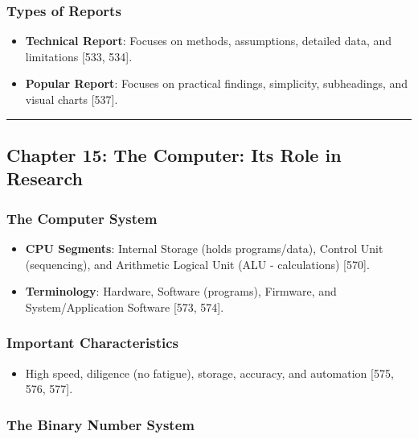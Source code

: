 \documentclass[
]{article}
\providecommand{\tightlist}{%
  \setlength{\itemsep}{0pt}\setlength{\parskip}{0pt}}
\begin{document}
\subsubsection{Types of Reports}\label{types-of-reports}

\begin{itemize}
\tightlist
\item
  \textbf{Technical Report}: Focuses on methods, assumptions, detailed
  data, and limitations {[}533, 534{]}.
\item
  \textbf{Popular Report}: Focuses on practical findings, simplicity,
  subheadings, and visual charts {[}537{]}.
\end{itemize}

\begin{center}\rule{0.5\linewidth}{0.5pt}\end{center}

\subsection{Chapter 15: The Computer: Its Role in
Research}\label{chapter-15-the-computer-its-role-in-research}

\subsubsection{The Computer System}\label{the-computer-system}

\begin{itemize}
\tightlist
\item
  \textbf{CPU Segments}: Internal Storage (holds programs/data), Control
  Unit (sequencing), and Arithmetic Logical Unit (ALU - calculations)
  {[}570{]}.
\item
  \textbf{Terminology}: Hardware, Software (programs), Firmware, and
  System/Application Software {[}573, 574{]}.
\end{itemize}

\subsubsection{Important
Characteristics}\label{important-characteristics}

\begin{itemize}
\tightlist
\item
  High speed, diligence (no fatigue), storage, accuracy, and automation
  {[}575, 576, 577{]}.
\end{itemize}

\subsubsection{The Binary Number System}\label{the-binary-number-system}
\end{document}
